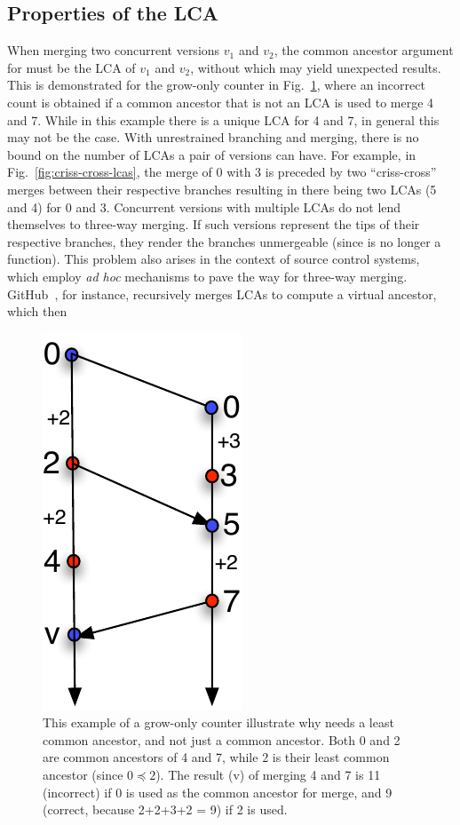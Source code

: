 \subsection{Properties of the LCA}
\label{sec:meta}

When merging two concurrent versions $v_1$ and $v_2$, the common
ancestor argument for  must be the LCA of $v_1$ and $v_2$,
without which  may yield unexpected results. This is
demonstrated for the grow-only counter in
Fig.~\ref{fig:merge-needs-lca}, where an incorrect count is obtained if a
common ancestor that is not an LCA is used to merge 4 and 7. While in
this example there is a unique LCA for 4 and 7, in general this may
not be the case. With unrestrained branching and merging, there is no
bound on the number of LCAs a pair of versions can have.  For example,
in Fig.~\ref{fig:criss-cross-lcas}, the merge of 0 with 3 is preceded
by two ``criss-cross'' merges between their respective branches
resulting in there being two LCAs (5 and 4) for 0 and 3. 
Concurrent versions with multiple LCAs do not lend themselves to
three-way merging. If such versions represent the tips of their respective
branches, they render the branches unmergeable (since   is no
longer a function). This problem also arises in the context of source
control systems, which employ \emph{ad hoc} mechanisms to pave the way
for three-way merging.  GitHub~\cite{github}, for instance,
recursively merges LCAs to compute a virtual ancestor, which then
\begin{figure}
\centering
\includegraphics[scale=0.45]{Figures/merge-needs-lca}
\caption{This example of a grow-only counter illustrate why 
needs a least common ancestor, and not just a common ancestor. Both 0
and 2 are common ancestors of 4 and 7, while 2 is their least common
ancestor (since $0 \preceq 2$). The result (v) of merging 4 and 7 is
11 (incorrect) if 0 is used as the common ancestor for merge, and 9
(correct, because 2+2+3+2 = 9) if 2 is used. }
\label{fig:merge-needs-lca}
\end{figure}
